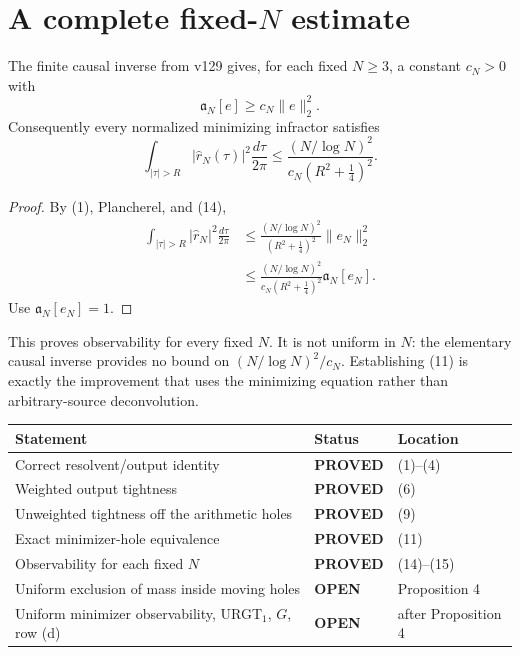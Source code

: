 \documentclass[11pt]{article}
\newcommand{\PROVED}{\textcolor{green!40!black}{\textbf{PROVED}}}
\newcommand{\OPEN}{\textcolor{red!70!black}{\textbf{OPEN}}}
\begin{document}
\section{A complete fixed-$N$ estimate}

The finite causal inverse from v129 gives, for each fixed $N\ge3$, a
constant $c_N>0$ with
\begin{equation}
 \mathfrak a_N[e]\ge c_N\|e\|_2^2.                              \tag{14}
\end{equation}
Consequently every normalized minimizing infractor satisfies
\begin{equation}
 \boxed{
 \int_{|\tau|>R}|\widehat r_N(\tau)|^2\frac{d\tau}{2\pi}
 \le
 \frac{(N/\log N)^2}{c_N(R^2+\frac14)^2}.}                       \tag{15}
\end{equation}

\begin{proof}
By (1), Plancherel, and (14),
\begin{align*}
 \int_{|\tau|>R}|\widehat r_N|^2\frac{d\tau}{2\pi}
 &\le \frac{(N/\log N)^2}{(R^2+\frac14)^2}\|e_N\|_2^2\\
 &\le \frac{(N/\log N)^2}{c_N(R^2+\frac14)^2}
       \mathfrak a_N[e_N].
\end{align*}
Use $\mathfrak a_N[e_N]=1$.
\end{proof}

This proves observability for every fixed $N$.  It is not uniform in $N$:
the elementary causal inverse provides no bound on
$(N/\log N)^2/c_N$.  Establishing (11) is exactly the improvement that
uses the minimizing equation rather than arbitrary-source deconvolution.

\begin{center}
\begin{tabular}{>{\raggedright\arraybackslash}p{.58\linewidth}
                >{\centering\arraybackslash}p{.14\linewidth}
                >{\raggedright\arraybackslash}p{.18\linewidth}}
\toprule
Statement & Status & Location \\
\midrule
Correct resolvent/output identity & \PROVED & (1)--(4) \\
Weighted output tightness & \PROVED & (6) \\
Unweighted tightness off the arithmetic holes & \PROVED & (9) \\
Exact minimizer-hole equivalence & \PROVED & (11) \\
Observability for each fixed $N$ & \PROVED & (14)--(15) \\
Uniform exclusion of mass inside moving holes & \OPEN & Proposition 4 \\
Uniform minimizer observability, URGT$_1$, $G$, row (d) & \OPEN & after Proposition 4 \\
\bottomrule
\end{tabular}
\end{center}
\end{document}
